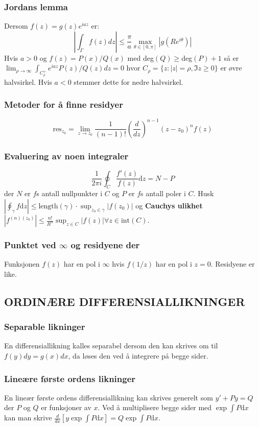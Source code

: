 \documentclass[a4paper, norsk, 8pt]{article}
\newcommand{\DIFF}[2]{ \frac{d#1}{d#2} }
\begin{document}
\begin{multicols*}{2}
\subsubsection*{\small Jordans lemma}
Dersom $f(z)=g(z)e^{iaz}$ er:
\[
\left| \int_{\Gamma} f(z)dz \right| \leq \frac{\pi}{a}\max_{\theta\in[0,\pi]}\left|g(Re^{i\theta})\right|
\]
Hvis $a>0$ og $f(z)=P(x)/Q(x)$ med deg$(Q)\geq$deg$(P)+1$ så er $\lim_{\rho\rightarrow \infty} \int_{C_\rho^+}e^{iaz}P(z)/Q(z)dz=0$ hvor $C_\rho=\{z: |z|=\rho, \Im{z}\geq 0 \}$ er øvre halvsirkel. Hvis $a<0$ stemmer dette for nedre halvsirkel.

\subsubsection*{\small Metoder for å finne residyer}
\[ \mbox{res}_{z_0}=\lim_{z\rightarrow z_0} \frac{1}{(n-1)!}\left(\DIFF{}{z}\right)^{n-1}(z-z_0)^nf(z) \]

\subsubsection*{\small Evaluering av noen integraler}
\[\frac{1}{2\pi i}\oint_C\frac{f'(z)}{f(z)}\mbox{d}z=N-P\] der $N$ er $f$s antall nullpunkter i $C$ og $P$ er $f$s antall poler i $C$.
Husk $\left|\oint_\gamma f \mbox{d}z\right|\leq \mbox{length}(\gamma)\cdot \sup_{z_0\in\gamma}|f(z_0)|$ og \textbf{Cauchys ulikhet} $\left|f^{(n)(z_0)}\right|\leq \frac{n!}{R^n}\sup_{z\in C}|f(z)| \forall z \in \mbox{int}(C)$.

\subsubsection*{\small Punktet ved $\infty$ og residyene der}
Funksjonen $f(z)$ har en pol i $\infty$ hvis $f(1/z)$ har en pol i $z=0$. Residyene er like.



\subsection*{\footnotesize ORDINÆRE DIFFERENSIALLIKNINGER }
\subsubsection*{\small Separable likninger}
En differensiallikning kalles separabel dersom den kan skrives om til $f(y)dy=g(x)dx$, da løses den ved å integrere på begge sider.

\subsubsection*{\small Lineære første ordens likninger}
En lineær første ordens differensiallikning kan skrives generelt som $y'+Py=Q$ der $P$ og $Q$ er funksjoner av $x$. Ved å multiplisere begge sider med $\exp{\int P \mbox{d}x}$ kan man skrive $\DIFF{}{x}\left[y\exp{\int P \mbox{d}x}\right]=Q\exp{\int P \mbox{d}x}$.


\end{multicols*}
\end{document}
